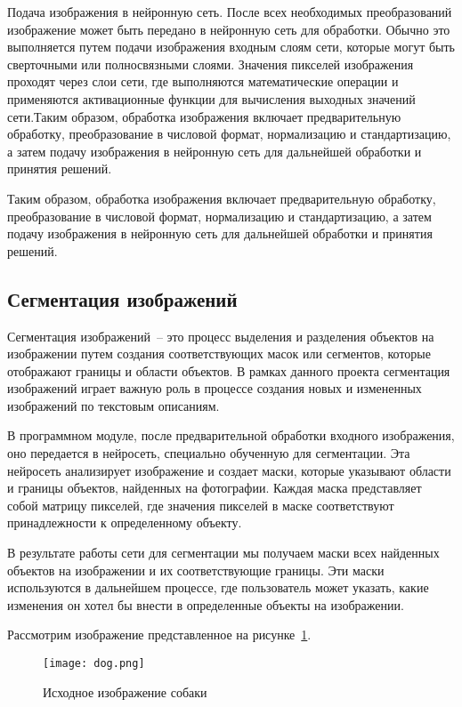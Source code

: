 \begin{enumerate_step}
    \item Подача изображения в нейронную сеть. После всех необходимых преобразований изображение может быть передано в нейронную сеть для обработки. Обычно это выполняется путем подачи изображения входным слоям сети, которые могут быть сверточными или полносвязными слоями. Значения пикселей изображения проходят через слои сети, где выполняются математические операции и применяются активационные функции для вычисления выходных значений сети.Таким образом, обработка изображения включает предварительную обработку, преобразование в числовой формат, нормализацию и стандартизацию, а затем подачу изображения в нейронную сеть для дальнейшей обработки и принятия решений.
\end{enumerate_step}

Таким образом, обработка изображения включает предварительную обработку, преобразование в числовой формат, нормализацию и стандартизацию, а затем подачу изображения в нейронную сеть для дальнейшей обработки и принятия решений.

\subsection{Сегментация изображений}

Сегментация изображений~-- это процесс выделения и разделения 
объектов на изображении путем создания соответствующих масок или 
сегментов, которые отображают границы и области объектов. В рамках 
данного проекта сегментация изображений играет важную роль в процессе
создания новых и измененных изображений по текстовым описаниям.

В программном модуле, после предварительной обработки входного 
изображения, оно передается в нейросеть, специально обученную для 
сегментации. Эта нейросеть анализирует изображение и создает маски, 
которые указывают области и границы объектов, найденных на фотографии. 
Каждая маска представляет собой матрицу пикселей, где значения пикселей в маске соответствуют принадлежности к определенному объекту.

В результате работы сети для сегментации мы получаем маски всех 
найденных объектов на изображении и их соответствующие границы. Эти 
маски используются в дальнейшем процессе, где пользователь может указать, 
какие изменения он хотел бы внести в определенные объекты на изображении.

Рассмотрим изображение представленное на рисунке~\ref{dev::dog}.

\begin{figure}[ht]
    \centering
    \texttt{[image: dog.png]}
    \caption{Исходное изображение собаки}
    \label{dev::dog}
\end{figure}

